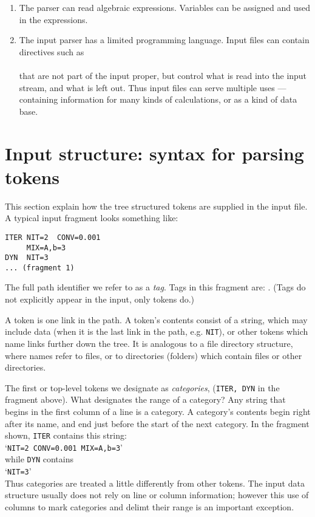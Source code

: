 \documentclass{article}
\begin{document}
\begin{enumerate}
\item The parser can read algebraic expressions. Variables can be assigned
      and used in the expressions.

\item The input parser has a limited programming language.  Input files can
      contain directives such as \\
        \indent {} \\
      that are not part of the input proper, but control what is read into
      the input stream, and what is left out.  Thus input files can serve
      multiple uses --- containing information for many kinds of
      calculations, or as a kind of data base.

\end{enumerate}

\section{\large Input structure: syntax for parsing tokens}
\label{sec:input-struct}

This section explain how the tree structured tokens are
supplied in the input file.
A typical input fragment looks something like:
\begin{verbatim}
ITER NIT=2  CONV=0.001
     MIX=A,b=3
DYN  NIT=3
... (fragment 1)
\end{verbatim}
The full path
identifier we refer to as a \emph{tag}.  Tags in this fragment are:
.\quad
(Tags do not explicitly appear in the input, only tokens do.)

\vskip 6pt\noindent A token is one link in the path.  A token's contents
consist of a string, which may include data (when it is the last link in
the path, e.g. {\tt{}NIT}), or other tokens which name links
further down the tree.
It is analogous to a file directory structure, where names refer to
files, or to directories (folders) which contain files or other directories.  

\vskip 6pt\noindent The first or top-level tokens we designate as
\emph{categories}, ({\tt ITER, DYN} in the fragment above). 
What designates the range of a category?  Any string that begins in the
first column of a line is a category.  A category's contents begin right
after its name, and end just before the start of the next category.
In the fragment shown,
{\tt ITER} contains this string:\\
\indent `{\tt NIT=2 CONV=0.001 MIX=A,b=3}'\\
while {\tt DYN} contains\\
\indent `{\tt NIT=3}'\\
Thus categories are treated a little differently from other tokens.  The
input data structure usually does not rely on line or column information;
however this use of columns to mark categories and delimt their range is an
important exception.
\end{document}
